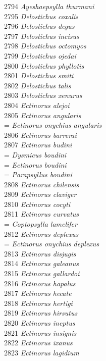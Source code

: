 \documentclass[
]{article}
\begin{document}
2794 \emph{Ayeshaepsylla thurmani}\\
2795 \emph{Delostichus coxalis}\\
2796 \emph{Delostichus degus}\\
2797 \emph{Delostichus incisus}\\
2798 \emph{Delostichus octomyos}\\
2799 \emph{Delostichus ojedai}\\
2800 \emph{Delostichus phyllotis}\\
2801 \emph{Delostichus smiti}\\
2802 \emph{Delostichus talis}\\
2803 \emph{Delostichus xenurus}\\
2804 \emph{Ectinorus alejoi}\\
2805 \emph{Ectinorus angularis}\\
= \emph{Ectinorus onychius angularis}\\
2806 \emph{Ectinorus barrerai}\\
2807 \emph{Ectinorus budini}\\
= \emph{Dysmicus boudini}\\
= \emph{Ectinorus boudini}\\
= \emph{Parapsyllus boudini}\\
2808 \emph{Ectinorus chilensis}\\
2809 \emph{Ectinorus claviger}\\
2810 \emph{Ectinorus cocyti}\\
2811 \emph{Ectinorus curvatus}\\
= \emph{Coptopsylla lamelifer}\\
2812 \emph{Ectinorus deplexus}\\
= \emph{Ectinorus onychius deplexus}\\
2813 \emph{Ectinorus disjugis}\\
2814 \emph{Ectinorus galeanus}\\
2815 \emph{Ectinorus gallardoi}\\
2816 \emph{Ectinorus hapalus}\\
2817 \emph{Ectinorus hecate}\\
2818 \emph{Ectinorus hertigi}\\
2819 \emph{Ectinorus hirsutus}\\
2820 \emph{Ectinorus ineptus}\\
2821 \emph{Ectinorus insignis}\\
2822 \emph{Ectinorus ixanus}\\
2823 \emph{Ectinorus lagidium}\\
\end{document}
